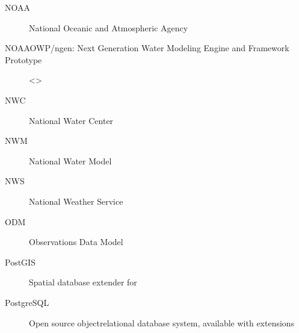\documentclass[letterpaper,10pt,english]{sphinxmanual}
\begin{document}
\begin{description}
\item[{NOAA\label{\detokenize{glossary:term-NOAA}}}] \leavevmode
\sphinxAtStartPar
National Oceanic and Atmospheric Agency

\item[{NOAA\sphinxhyphen{}OWP/ngen: Next Generation Water Modeling Engine and Framework Prototype\label{\detokenize{glossary:term-NOAA-OWP-ngen-Next-Generation-Water-Modeling-Engine-and-Framework-Prototype}}}] \leavevmode
\sphinxAtStartPar
\textless{}\textgreater{}

\item[{NWC\label{\detokenize{glossary:term-NWC}}}] \leavevmode
\sphinxAtStartPar
National Water Center

\item[{NWM\label{\detokenize{glossary:term-NWM}}}] \leavevmode
\sphinxAtStartPar
National Water Model

\item[{NWS\label{\detokenize{glossary:term-NWS}}}] \leavevmode
\sphinxAtStartPar
National Weather Service

\item[{ODM\label{\detokenize{glossary:term-ODM}}}] \leavevmode
\sphinxAtStartPar
Observations Data Model

\item[{PostGIS\label{\detokenize{glossary:term-PostGIS}}}] \leavevmode
\sphinxAtStartPar
Spatial database extender for {\hyperref[\detokenize{glossary:term-PostgreSQL}]{}}

\item[{PostgreSQL\label{\detokenize{glossary:term-PostgreSQL}}}] \leavevmode
\sphinxAtStartPar
Open source object\sphinxhyphen{}relational database system, available with {\hyperref[\detokenize{glossary:term-PostGIS}]{}} extensions


\end{description}
\end{document}
